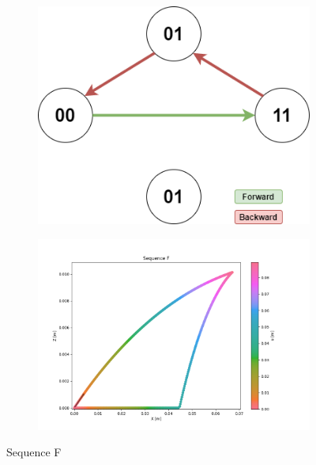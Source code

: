         \begin{figure}[h]
            \begin{subfigure}{.3\textwidth}
            \includegraphics[width=\textwidth]{images/Sequences-Sequence F.png}
            \end{subfigure}%
            \begin{subfigure}{.7\textwidth}
            \includegraphics[width=\textwidth]{images/F.png}
            \end{subfigure}
            \caption{Sequence F}
        \end{figure}
